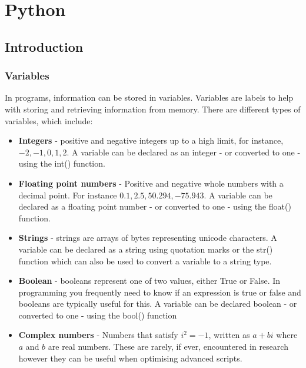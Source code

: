 \documentclass[
]{book}
\begin{document}
\hypertarget{python}{%
\chapter{Python}\label{python}}

\hypertarget{introduction-1}{%
\section{Introduction}\label{introduction-1}}

\hypertarget{variables}{%
\subsection{Variables}\label{variables}}

In programs, information can be stored in variables. Variables are labels to help with storing and retrieving information from memory. There are different types of variables, which include:

\begin{itemize}
\item
  \textbf{Integers} - positive and negative integers up to a high limit, for instance, \(-2, -1, 0, 1, 2\). A variable can be declared as an integer - or converted to one - using the int() function.
\item
  \textbf{Floating point numbers} - Positive and negative whole numbers with a decimal point. For instance \(0.1, 2.5, 50.294, -75.943\). A variable can be declared as a floating point number - or converted to one - using the float() function.
\item
  \textbf{Strings} - strings are arrays of bytes representing unicode characters. A variable can be declared as a string using quotation marks or the str() function which can also be used to convert a variable to a string type.
\item
  \textbf{Boolean} - booleans represent one of two values, either True or False. In programming you frequently need to know if an expression is true or false and booleans are typically useful for this. A variable can be declared boolean - or converted to one - using the bool() function
\item
  \textbf{Complex numbers} - Numbers that satisfy \(i^2=-1\), written as \(a+bi\) where \(a\) and \(b\) are real numbers. These are rarely, if ever, encountered in research however they can be useful when optimising advanced scripts.
\end{itemize}
\end{document}
